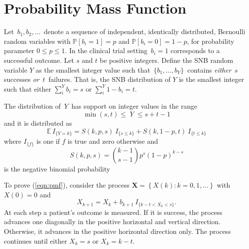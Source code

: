\documentclass[review]{elsarticle}
\begin{document}
\section{Probability Mass Function}
\label{notation.section}

Let $\,b_1, b_2, \ldots \,$ denote a sequence of independent, identically
distributed, Bernoulli random variables with $\mathbb{P}[b_i=1]=p$ and
$\mathbb{P}[b_i = 0] = 1-p$, for
probability parameter $0\leq p \leq 1$. In the clinical trial setting
$\,b_i = 1$ corresponds to a successful outcome.  Let $s$ and $t$ be
positive integers.  Define the SNB random
variable $Y$ as the smallest
integer value such that $\,\{b_1, \ldots , b_Y\}\,$ contains {\em either}
$\,s\,$ successes {\em or} $\,t\,$ failures. That is, the SNB distribution
of $Y$ is the smallest integer such that either
$\sum_i^Y b_i = s$ or $\sum_i^Y 1-b_i = t$.

The distribution of $\,Y\,$ has support on integer values in the range
\begin{equation*}               
     \min(s,t) \leq \; Y \;\leq s+t-1  \label{range.y.eq}
\end{equation*}
and it is distributed as
\begin{equation} \label{eqn:pmf}
\mathbb{E}\  I_{\{Y=k\}} = S(k, p, s) \ I_{\{s \leq k\}} + 
  S(k, 1-p, t) \ I_{\{ t \leq k \}}
\end{equation}
where $I_{\{f\}}$ is one if $f$ is true and zero otherwise and
\begin{equation} \label{eqn:N}
S(k, p, s) = {k-1 \choose s-1} p^s (1-p)^{k-s} 
\end{equation}
is the negative binomial probability

To prove (\ref{eqn:pmf}), consider the
process $\mathbf{X} = \left\{X(k) : k = 0,1,... \right\}$
with $X(0)=0$ and
\begin{equation*} \label{eqn:proc}
X_{k+1} = X_k + b_{k+1} \ I_{\{ k-t < X_k < s\}}.
\end{equation*}
At each step a patient's outcome is measured. If it is success, the process 
advances one diagonally in the
positive horizontal and vertical direction.
Otherwise, it advances in the positive horizontal direction only. The
process continues until either $X_k = s$ or $X_k = k-t$.
\end{document}
